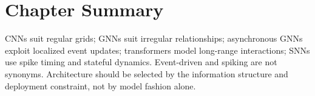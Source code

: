 \section{Chapter Summary}

CNNs suit regular grids; GNNs suit irregular relationships; asynchronous GNNs exploit localized event updates; transformers model long-range interactions; SNNs use spike timing and stateful dynamics. Event-driven and spiking are not synonyms. Architecture should be selected by the information structure and deployment constraint, not by model fashion alone.
